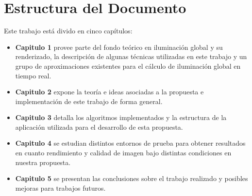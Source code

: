 \section*{Estructura del Documento} %
\label{sec:estructura_del_documento}
Este trabajo está divido en cinco capítulos:
\begin{itemize}
\item \textbf{Capitulo 1} provee parte del fondo teórico en iluminación global y su renderizado, la descripción de algunas técnicas utilizadas en este trabajo y un grupo de aproximaciones existentes para el cálculo de iluminación global en tiempo real.
\item \textbf{Capitulo 2} expone la teoría e ideas asociadas a la propuesta e implementación de este trabajo de forma general.
\item \textbf{Capitulo 3} detalla los algoritmos implementados y la estructura de la aplicación utilizada para el desarrollo de esta propuesta.
\item \textbf{Capitulo 4} se estudian distintos entornos de prueba para obtener resultados en cuanto rendimiento y calidad de imagen bajo distintas condiciones en nuestra propuesta.
\item \textbf{Capitulo 5} se presentan las conclusiones sobre el trabajo realizado y posibles mejoras para trabajos futuros.
\end{itemize}
